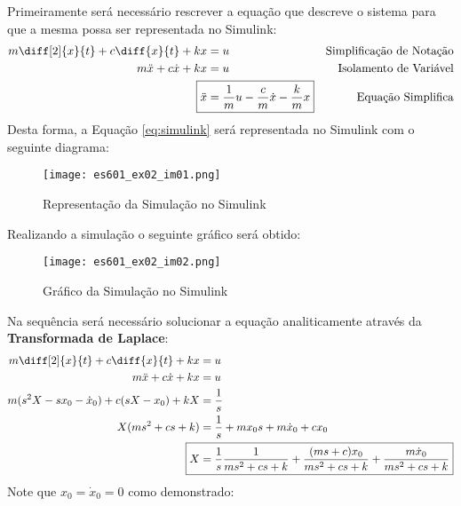 \documentclass{article}
\begin{document}
            \begin{resolution}
                Primeiramente será necessário rescrever a equação que descreve o sistema para que a mesma possa ser representada no Simulink:
                    \begin{align}
                        m\diff[2]{x}{t} + c\diff{x}{t} + kx &= u & \text{Simplificação de Notação\nonumber}\\
                        m\ddot{x} + c\dot{x} + kx           &= u & \text{Isolamento de Variável}\nonumber\\
                        \Aboxed{\ddot{x} &= \frac{1}{m}u - \frac{c}{m}\dot{x} - \frac{k}{m}x}   & \text{Equação Simplifica}\label{eq:simulink}
                    \end{align}
                Desta forma, a Equação \ref{eq:simulink} será representada no Simulink com o seguinte diagrama:
                    \begin{figure}[H]
                        \centering
                        \texttt{[image: es601\_ex02\_im01.png]}
                        \caption{Representação da Simulação no Simulink}
                    \end{figure}
\newpage
                Realizando a simulação o seguinte gráfico será obtido:
                    \begin{figure}[H]
                        \centering
                        \texttt{[image: es601\_ex02\_im02.png]}
                        \caption{Gráfico da Simulação no Simulink}
                    \end{figure}
                Na sequência será necessário solucionar a equação analiticamente através da \textbf{Transformada de Laplace}:
                    \begin{align}
                        m\diff[2]{x}{t} + c\diff{x}{t} + kx &= u \nonumber\\
                        m\ddot{x} + c\dot{x} + kx           &= u \nonumber\\
                        m(s^2X - sx_{0} -\dot{x}_{0}) + c(sX - x_{0}) + kX & = \frac{1}{s}\nonumber\\
                        X(ms^2 + cs + k) &= \frac{1}{s} + mx_{0}s + m\dot{x}_{0} + cx_{0}\nonumber\\
                        \Aboxed{X &= \frac{1}{s}\frac{1}{ms^2 + cs + k} + \frac{(ms + c)x_{0}}{ms^2 + cs + k} + \frac{m\dot{x}_{0}}{ms^2 + cs + k}}
                    \end{align}
                Note que $x_{0} = \dot{x}_{0} = 0$ como demonstrado:

\end{resolution}
\end{document}
